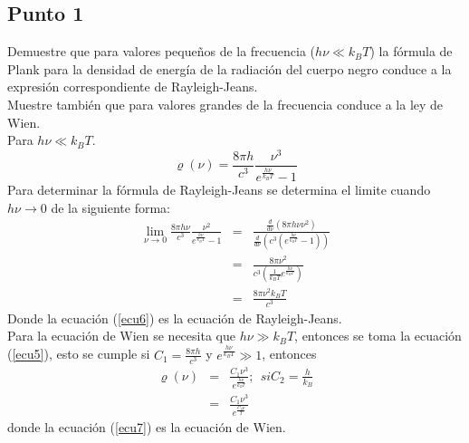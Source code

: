 \documentclass[11pt,graphicx,caption,rotating]{article}
\begin{document}
\subsection{Punto 1}
\noindent
Demuestre que para valores pequeños de la frecuencia ($h \nu \ll k_B T$) la fórmula de Plank para la densidad de energía de la radiación del cuerpo negro conduce a la expresión correspondiente de Rayleigh-Jeans.\\
Muestre también que para valores grandes de la frecuencia conduce a la ley de Wien.\[\]
Para $h \nu \ll k_B T$.\\
\begin{equation}
 \varrho (\nu)= \frac{8 \pi h}{c^{3}} \frac{\nu ^{3}}{e^{\frac{h \nu}{k_B T}} -1}
\label{ecu5}
\end{equation}
\noindent
Para determinar la fórmula de Rayleigh-Jeans se determina el limite cuando $h \nu \rightarrow 0$ de la siguiente forma:
\begin{eqnarray}
 \mathop {\lim }\limits_{\nu  \to 0} \frac{{8\pi h \nu }}{{c^3 }}\frac{{\nu ^2 }}{{e^{\frac{{h\nu }}{{k_B T}}}  - 1}} & = & \frac{{\frac{d}{{d\nu }}\left( {8\pi h\nu \nu ^2 } \right)}}{{\frac{d}{{d\nu }}\left( {c^3 \left( {e^{\frac{{h\nu }}{{k_B T}}}  - 1} \right)} \right)}}\nonumber \\
 & = & \frac{8\pi \nu ^2}{c^3 \left( {\frac{1}{{k_B T}}e^{\frac{{h\nu }}{{k_B T}}} } \right)}\nonumber \\
 & = & \frac{8\pi \nu ^2 k_B T}{c^3} \label{ecu6}
\end{eqnarray}
\noindent
Donde la ecuación (\ref{ecu6}) es la ecuación de Rayleigh-Jeans.\[\]
Para la ecuación de Wien se necesita que $h \nu \gg k_B T$, entonces se toma la ecuación (\ref{ecu5}), esto se cumple si $C_1=\frac{8 \pi h}{c^3}$ y $e^{\frac{h \nu}{k_B T}}\gg 1$, entonces
\begin{eqnarray}
 \varrho (\nu) & = & \frac{C_1 \nu ^3}{e^{\frac{h \nu}{k_B T}}};\ \ si C_2 = \frac{h}{k_B}\nonumber \\
 & = & \frac{C_1 \nu ^3}{e^{\frac{C_2 \nu}{ T}}} \label{ecu7}
\end{eqnarray}
\noindent
donde la ecuación (\ref{ecu7}) es la ecuación de Wien.
\end{document}
